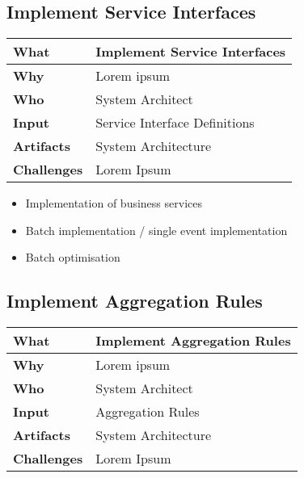 \subsection{Implement Service Interfaces}
\begin{minipage}{\textwidth}
 \label{table:ch6_Task_Implement_Service_Interfaces}
\begin{tabular}
	{|m{3cm}|m{10cm}|} \hline \bfseries What & Implement Service Interfaces\\
	\hline \bfseries Why & Lorem ipsum\\
	\hline \bfseries Who & System Architect\\
	\hline \bfseries Input & Service Interface Definitions\\
	\hline \bfseries Artifacts & System Architecture\\
	\hline \bfseries Challenges & Lorem Ipsum\\
	\hline 
\end{tabular}
\end{minipage}

\begin{itemize}
	\item Implementation of business services
	\item Batch implementation / single event implementation
	\item Batch optimisation
\end{itemize}

\subsection{Implement Aggregation Rules}
\begin{minipage}{\textwidth}
 \label{table:ch6_Task_Implement_Aggregation_Rules}
\begin{tabular}
	{|m{3cm}|m{10cm}|} \hline \bfseries What & Implement Aggregation Rules\\
	\hline \bfseries Why & Lorem ipsum\\
	\hline \bfseries Who & System Architect\\
	\hline \bfseries Input & Aggregation Rules\\
	\hline \bfseries Artifacts & System Architecture\\
	\hline \bfseries Challenges & Lorem Ipsum\\
	\hline 
\end{tabular}
\end{minipage}

